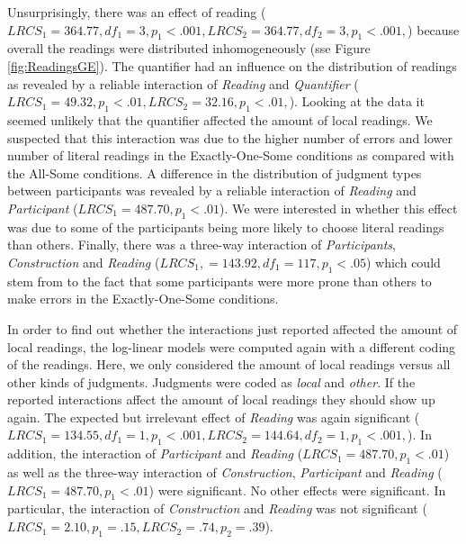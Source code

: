 \documentclass[a4paper,10pt]{article}
\begin{document}
Unsurprisingly, there was an effect of reading ($LRCS_1=364.77, df_1 = 3, p_1<.001, LRCS_2=364.77, df_2 = 3, p_1<.001,$) because overall the readings were distributed inhomogeneously (sse Figure \ref{fig:ReadingsGE}). The quantifier had an influence on the distribution of readings as revealed by a reliable interaction of {\it Reading} and {\it Quantifier} ($LRCS_1=49.32, p_1<.01,LRCS_2=32.16, p_1<.01,$). Looking at the data  it seemed unlikely that the quantifier affected the amount of local readings. We suspected that this interaction was due to the higher number of errors and lower number of literal readings in the Exactly-One-Some conditions as compared with the All-Some conditions. A difference in the distribution of judgment types between participants was revealed by a reliable interaction of {\it Reading} and {\it Participant} ($LRCS_1=487.70, p_1<.01$). We were interested in whether this effect was due to some of the participants being more likely to choose literal readings than others. Finally, there was a three-way interaction of {\it Participants}, {\it Construction} and {\it Reading} ($LRCS_1, = 143.92, df_1 = 117, p_1<.05$) which could stem from to the fact that some participants were more prone than others to make errors in the Exactly-One-Some conditions.  

In order to find out whether the interactions just reported affected the amount of local readings, the log-linear models were computed again with a different coding of the readings. Here,  we only considered the amount of local readings versus all other kinds of judgments. Judgments were coded as {\it local} and {\it other}. If the reported interactions affect the amount of local readings they should show up again. The  expected but irrelevant effect of {\it Reading} was again significant ($LRCS_1=134.55, df_1 = 1, p_1<.001, LRCS_2=144.64, df_2 = 1, p_1<.001,$). In addition, the interaction of {\it Participant} and {\it Reading} ($LRCS_1=487.70, p_1<.01$) as well as the three-way interaction of {\it Construction}, {\it Participant} and {\it Reading} ($LRCS_1=487.70, p_1<.01$) were significant. No other effects were significant. In particular, the interaction of {\it Construction} and {\it Reading} was not significant ($LRCS_1=2.10, p_1=.15,LRCS_2=.74, p_2=.39$).
\end{document}
